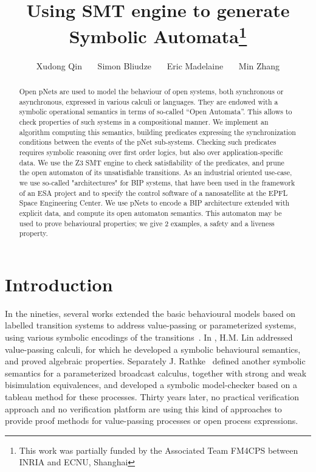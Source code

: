 \documentclass{lncs/llncs}
\title{Using SMT engine to generate Symbolic Automata\thanks{This work was partially 
funded by the Associated Team FM4CPS
  between INRIA and ECNU, Shanghai}}
\author{ Xudong Qin\inst{1,2}  \ \ \  Simon Bliudze\inst{3} \ \ \ Eric Madelaine\inst{1}
  \ \ \  Min Zhang\inst{2}}
\institute{Universit\'e C\^ote d'Azur, Inria, CNRS, I3S, 06902 Sophia Antipolis, France
        \and Shanghai Key Laboratory of Trustworthy Computing, ECNU, China
\and INRIA Lille -- Nord Europe, 40 avenue Halley,
59650 Villeneuve d'Ascq,
France}
\date{}                                           %
\begin{document}
\maketitle



\begin{abstract}
Open pNets are used to model the behaviour of open systems, both
synchronous or asynchronous, expressed in various calculi or
languages. They are endowed with a symbolic operational semantics in
terms of so-called ``Open Automata''. This allows to check properties of
such systems in a compositional manner. 
We implement an algorithm computing this semantics,
building predicates expressing the synchronization conditions
between the events of the pNet sub-systems. Checking such
predicates requires symbolic reasoning over first order logics, but
also over application-specific data. We use the Z3 SMT engine to check
satisfiability of the predicates, and prune the open automaton of its
unsatisfiable transitions.
As an industrial oriented use-case, we use so-called "architectures"
for BIP systems, that have been used in the framework of an ESA project and to specify the control software of
a nanosatellite at the EPFL Space Engineering Center. We use pNets to encode a BIP architecture
extended with explicit data, and compute its
open automaton semantics. This automaton may be used to prove
behavioural properties; we give 2 examples, a safety and a liveness
property.
\end{abstract}


\section{Introduction}

In the nineties, several 
works extended the basic behavioural models based on labelled
transition systems to address value-passing or parameterized systems, using
various symbolic encodings of the
transitions~\cite{deSimone85,Larsen87,HennessyLin:TCS95,Linconcur96}. 
In \cite{Linconcur96}, H.M. Lin addressed value-passing calculi, for which he
developed a symbolic behavioural semantics, and proved algebraic properties.
Separately J. Rathke~\cite{HennessyRathke:TCS98} defined another
symbolic semantics for 
a parameterized broadcast calculus, together with strong and weak bisimulation
equivalences, and developed a symbolic model-checker based on a tableau
method for these processes. Thirty years later, no
practical verification approach and no verification platform are
using this kind of approaches to provide proof methods for
value-passing processes or open process expressions. 
\end{document}
